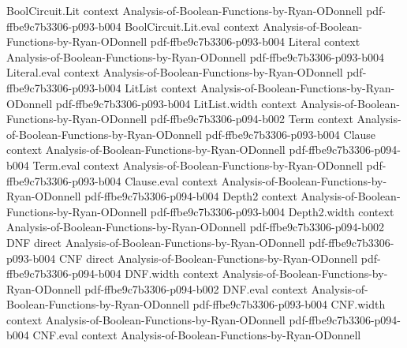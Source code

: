 \begin{theorem}
\leanok
{}
\proofstep
  {BoolCircuit.Lit}
  {context}
  {Analysis-of-Boolean-Functions-by-Ryan-ODonnell}
  {pdf-ffbe9c7b3306-p093-b004}
\proofstep
  {BoolCircuit.Lit.eval}
  {context}
  {Analysis-of-Boolean-Functions-by-Ryan-ODonnell}
  {pdf-ffbe9c7b3306-p093-b004}
\proofstep
  {Literal}
  {context}
  {Analysis-of-Boolean-Functions-by-Ryan-ODonnell}
  {pdf-ffbe9c7b3306-p093-b004}
\proofstep
  {Literal.eval}
  {context}
  {Analysis-of-Boolean-Functions-by-Ryan-ODonnell}
  {pdf-ffbe9c7b3306-p093-b004}
\proofstep
  {LitList}
  {context}
  {Analysis-of-Boolean-Functions-by-Ryan-ODonnell}
  {pdf-ffbe9c7b3306-p093-b004}
\proofstep
  {LitList.width}
  {context}
  {Analysis-of-Boolean-Functions-by-Ryan-ODonnell}
  {pdf-ffbe9c7b3306-p094-b002}
\proofstep
  {Term}
  {context}
  {Analysis-of-Boolean-Functions-by-Ryan-ODonnell}
  {pdf-ffbe9c7b3306-p093-b004}
\proofstep
  {Clause}
  {context}
  {Analysis-of-Boolean-Functions-by-Ryan-ODonnell}
  {pdf-ffbe9c7b3306-p094-b004}
\proofstep
  {Term.eval}
  {context}
  {Analysis-of-Boolean-Functions-by-Ryan-ODonnell}
  {pdf-ffbe9c7b3306-p093-b004}
\proofstep
  {Clause.eval}
  {context}
  {Analysis-of-Boolean-Functions-by-Ryan-ODonnell}
  {pdf-ffbe9c7b3306-p094-b004}
\proofstep
  {Depth2}
  {context}
  {Analysis-of-Boolean-Functions-by-Ryan-ODonnell}
  {pdf-ffbe9c7b3306-p093-b004}
\proofstep
  {Depth2.width}
  {context}
  {Analysis-of-Boolean-Functions-by-Ryan-ODonnell}
  {pdf-ffbe9c7b3306-p094-b002}
\proofstep
  {DNF}
  {direct}
  {Analysis-of-Boolean-Functions-by-Ryan-ODonnell}
  {pdf-ffbe9c7b3306-p093-b004}
\proofstep
  {CNF}
  {direct}
  {Analysis-of-Boolean-Functions-by-Ryan-ODonnell}
  {pdf-ffbe9c7b3306-p094-b004}
\proofstep
  {DNF.width}
  {context}
  {Analysis-of-Boolean-Functions-by-Ryan-ODonnell}
  {pdf-ffbe9c7b3306-p094-b002}
\proofstep
  {DNF.eval}
  {context}
  {Analysis-of-Boolean-Functions-by-Ryan-ODonnell}
  {pdf-ffbe9c7b3306-p093-b004}
\proofstep
  {CNF.width}
  {context}
  {Analysis-of-Boolean-Functions-by-Ryan-ODonnell}
  {pdf-ffbe9c7b3306-p094-b004}
\proofstep
  {CNF.eval}
  {context}
  {Analysis-of-Boolean-Functions-by-Ryan-ODonnell}

\end{theorem}
